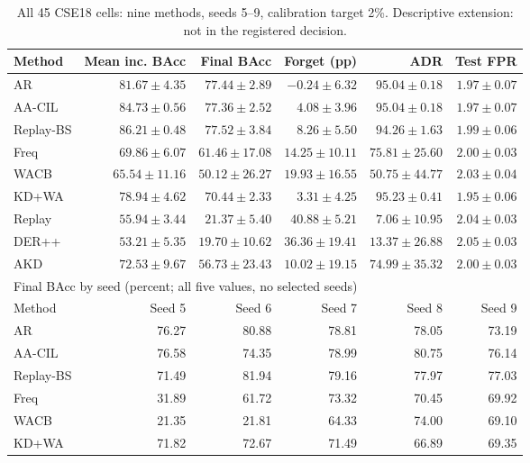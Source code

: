 \begin{table}[t]
\centering\small
\caption{All 45 CSE18 cells: nine methods, seeds 5--9, calibration target 2\%. Descriptive extension: not in the registered decision.}\label{tab:cse-all45-descriptive}
\setlength{\tabcolsep}{4pt}
\begin{tabular}{lrrrrr}
\toprule
Method & Mean inc. BAcc & Final BAcc & Forget (pp) & ADR & Test FPR \\
\midrule
AR & $81.67\pm4.35$ & $77.44\pm2.89$ & $-0.24\pm6.32$ & $95.04\pm0.18$ & $1.97\pm0.07$ \\
AA-CIL & $84.73\pm0.56$ & $77.36\pm2.52$ & $4.08\pm3.96$ & $95.04\pm0.18$ & $1.97\pm0.07$ \\
Replay-BS & $86.21\pm0.48$ & $77.52\pm3.84$ & $8.26\pm5.50$ & $94.26\pm1.63$ & $1.99\pm0.06$ \\
Freq & $69.86\pm6.07$ & $61.46\pm17.08$ & $14.25\pm10.11$ & $75.81\pm25.60$ & $2.00\pm0.03$ \\
WACB & $65.54\pm11.16$ & $50.12\pm26.27$ & $19.93\pm16.55$ & $50.75\pm44.77$ & $2.03\pm0.04$ \\
KD+WA & $78.94\pm4.62$ & $70.44\pm2.33$ & $3.31\pm4.25$ & $95.23\pm0.41$ & $1.95\pm0.06$ \\
Replay & $55.94\pm3.44$ & $21.37\pm5.40$ & $40.88\pm5.21$ & $7.06\pm10.95$ & $2.04\pm0.03$ \\
DER++ & $53.21\pm5.35$ & $19.70\pm10.62$ & $36.36\pm19.41$ & $13.37\pm26.88$ & $2.05\pm0.03$ \\
AKD & $72.53\pm9.67$ & $56.73\pm23.43$ & $10.02\pm19.15$ & $74.99\pm35.32$ & $2.00\pm0.03$ \\
\midrule
\multicolumn{6}{l}{Final BAcc by seed (percent; all five values, no selected seeds)} \\
Method & Seed 5 & Seed 6 & Seed 7 & Seed 8 & Seed 9 \\
\midrule
AR & 76.27 & 80.88 & 78.81 & 78.05 & 73.19 \\
AA-CIL & 76.58 & 74.35 & 78.99 & 80.75 & 76.14 \\
Replay-BS & 71.49 & 81.94 & 79.16 & 77.97 & 77.03 \\
Freq & 31.89 & 61.72 & 73.32 & 70.45 & 69.92 \\
WACB & 21.35 & 21.81 & 64.33 & 74.00 & 69.10 \\
KD+WA & 71.82 & 72.67 & 71.49 & 66.89 & 69.35 \\

\end{tabular}
\end{table}
